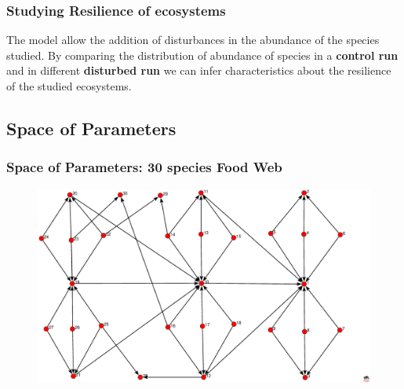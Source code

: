 \documentclass[xcolor=x11names,compress]{beamer}
\renewcommand{\(}{\begin{columns}}
\renewcommand{\)}{\end{columns}}
\newcommand{\<}[1]{\begin{column}{#1}}
\renewcommand{\>}{\end{column}}
\begin{document}
\begin{frame}
\frametitle{Studying Resilience of ecosystems}
\begin{block}{}
The model allow the addition of disturbances in the abundance of the species studied. By comparing the distribution of abundance of species in a \textbf{control run} and in different \textbf{disturbed run} we can infer characteristics about the resilience of the studied ecosystems. 
\end{block}
\end{frame}



\subsection{Space of Parameters}
\begin{frame}
\frametitle{Space of Parameters: 30 species Food Web}
\begin{figure}
  \includegraphics[width=1.0\textwidth]{./FoodWeb_30bloques9.eps}
\end{figure}
\end{frame}
\end{document}

